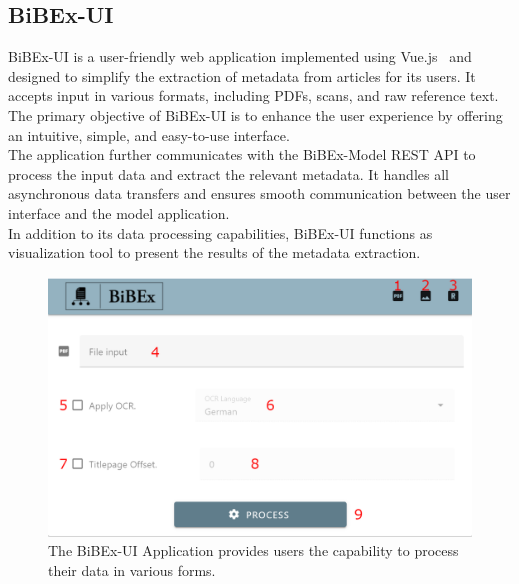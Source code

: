 \subsection{BiBEx-UI}\label{sec:bibex_ui}

BiBEx-UI is a user-friendly web application implemented using Vue.js~\cite{vuejs} and designed to simplify the extraction of metadata from articles for its users. It accepts input in various formats, including PDFs, scans, and raw reference text. The primary objective of BiBEx-UI is to enhance the user experience by offering an intuitive, simple, and easy-to-use interface.\\
The application further communicates with the BiBEx-Model REST API to process the input data and extract the relevant metadata. It handles all asynchronous data transfers and ensures smooth communication between the user interface and the model application.\\
In addition to its data processing capabilities, BiBEx-UI functions as visualization tool to present the results of the metadata extraction.
\newpage

\begin{figure}[!ht]
	\centering
	\includegraphics[width=1.0\linewidth]{images/bibex_ui.png}
	\caption{The BiBEx-UI Application provides users the capability to process their data in various forms.}
	\label{fig:bibex_ui}
\end{figure}

